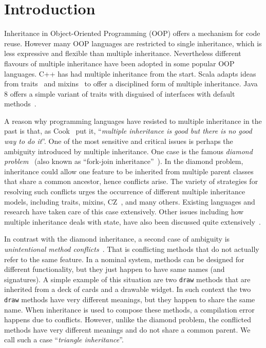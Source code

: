 \section{Introduction}
Inheritance in Object-Oriented Programming (OOP) offers a mechanism
for code reuse. However many OOP languages are restricted to single
inheritance, which is less expressive and flexible than multiple
inheritance. Nevertheless different flavours of multiple inheritance
have been adopted in some popular OOP languages. C++ has had 
multiple inheritance from the start. Scala adapts ideas from traits~\cite{scharli03traits} 
and mixins~\cite{bracha90mixin} to offer a disciplined form of multiple inheritance. Java 8 
offers a simple variant of traits with disguised of interfaces with default methods~\cite{goetz12fdefenders}.

A reason why programming languages have resisted to multiple
inheritance in the past is that, as Cook~\cite{Cook1987} put it, 
``\emph{multiple inheritance is good but there is no good way to do it}''.
One of the most sensitive and critical issues is perhaps the ambiguity
introduced by multiple inheritance. One case is the famous
\textit{diamond problem}~\cite{Sak89dis,Singh1995} (also known as ``fork-join inheritance''~\cite{Sak89dis}). 
In the diamond problem, inheritance could allow
one feature to be inherited from multiple parent classes that share a
common ancestor, hence
conflicts arise. The variety of strategies for resolving such conflicts
urges the occurrence of different multiple inheritance models,
including traits, mixins, CZ~\cite{malayeri2009cz}, and many others. Existing
languages and research have taken care of this case extensively. Other issues
including how multiple inheritance deals with state, 
have also been discussed quite extensively~\cite{classless,malayeri2009cz,stroustrup1995}.

In contrast with the diamond inheritance, a second case of ambiguity
is \textit{unintentional method conflicts}~\cite{scharli03traits}. That is conflicting 
methods that do not actually refer to the same feature. 
In a nominal system, methods can be designed for different
functionality, but they just happen to have same names (and
signatures).
A simple example of this situation are two \lstinline{draw} methods that
are inherited from a deck of cards and a drawable widget. 
In such context the two \lstinline{draw} methods have very different meanings, 
but they happen to share the same name.
When inheritance is used to compose these methods, a compilation 
error happens due to conflicts. However, unlike the diamond problem,
the conflicted methods have very different meanings and do not share a
common parent. We call such a case ``\textit{triangle inheritance}''.

